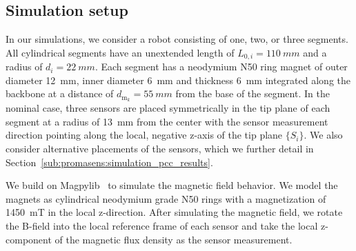 \subsection{Simulation setup}\label{sub:promasens:pcc_simulations:simulation_setup}
In our simulations, we consider a robot consisting of one, two, or three segments. %
All cylindrical segments have an unextended length of $L_{0,i} = \SI{110}{mm}$ and a radius of $d_i = \SI{22}{mm}$. Each segment has a neodymium N50 ring magnet of outer diameter \SI{12}{mm}, inner diameter \SI{6}{mm} and thickness \SI{6}{mm} integrated along the backbone at a distance of $d_{\mathrm{m}_k} = \SI{55}{mm}$ from the base of the segment.
In the nominal case, three sensors are placed symmetrically in the tip plane of each segment at a radius of \SI{13}{mm} from the center with the sensor measurement direction pointing along the local, negative z-axis of the tip plane $\{S_i\}$. We also consider alternative placements of the sensors, which we further detail in Section~\ref{sub:promasens:simulation_pcc_results}.

We build on Magpylib~\cite{magpylib2020} to simulate the magnetic field behavior.
We model the magnets as cylindrical neodymium grade N50 rings with a magnetization of \SI{1450}{mT} in the local z-direction. 
After simulating the magnetic field, we rotate the B-field into the local reference frame of each sensor and take the local z-component of the magnetic flux density as the sensor measurement.

